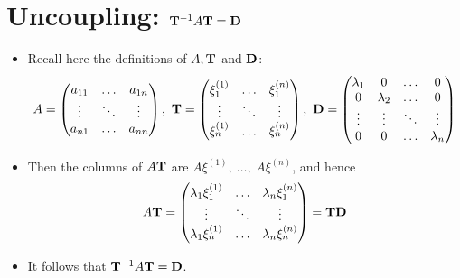 \documentclass[11pt,a4paper]{article}
\begin{document}
	\section*{Uncoupling: $\vb{T}^{-1}A\vb{T} = \vb{D}$}
	\begin{itemize}
		\item Recall here the definitions of $A, \vb{T}$ and $\vb{D}$:
		$$
		A =
		\begin{pmatrix}
			a_{11} & \ldots & a_{1n}\\
			\vdots & \ddots & \vdots\\
			a_{n1} & \ldots & a_{nn}
		\end{pmatrix},\ 
		\vb{T}=
		\begin{pmatrix}
			\xi_1^{(1)} & \ldots & \xi_1^{(n)}\\
			\vdots & \ddots & \vdots\\
			\xi_n^{(1)} & \ldots & \xi_n^{(n)}
		\end{pmatrix},\ 
		\vb{D} =
		\begin{pmatrix}
			\lambda_1 & 0 & \ldots & 0\\
			0 & \lambda_2 & \ldots & 0\\
			\vdots & \vdots & \ddots & \vdots\\
			0 & 0 & \ldots & \lambda_n
		\end{pmatrix}
		$$
		\item Then the columns of $A\vb{T}$ are $A\xi^{(1)},\ \ldots,\ A\xi^{(n)}$, and hence
		$$
		A\vb{T} =
		\begin{pmatrix}
			\lambda_1\xi_1^{(1)} & \ldots & \lambda_n\xi_1^{(n)}\\
			\vdots & \ddots & \vdots\\
			\lambda_1\xi_n^{(1)} & \ldots & \lambda_n\xi_n^{(n)}
		\end{pmatrix} = \vb{T}\vb{D}
		$$
		\item It follows that $\vb{T}^{-1}A\vb{T} = \vb{D}$.
	\end{itemize}
\end{document}
